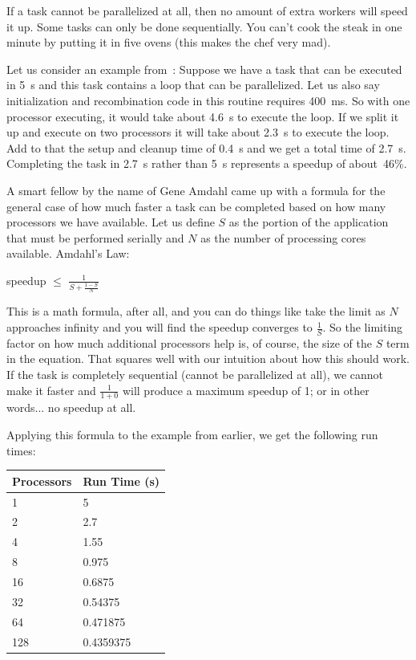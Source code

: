 If a task cannot be parallelized at all, then no amount of extra workers will speed it up. Some tasks can only be done sequentially. You can't cook the steak in one minute by putting it in five ovens (this makes the chef very mad).

Let us consider an example from~\cite{mte241}: Suppose we have a task that can be executed in 5~s and this task contains a loop that can be parallelized. Let us also say initialization and recombination code in this routine requires 400~ms. So with one processor executing, it would take about 4.6~s to execute the loop. If we split it up and execute on two processors it will take about 2.3~s to execute the loop. Add to that the setup and cleanup time of 0.4~s and we get a total time of 2.7~s. Completing the task in 2.7~s rather than 5~s represents a speedup of about~46\%.

A smart fellow by the name of Gene Amdahl came up with a formula for the general case of how much faster a task can be completed based on how many processors we have available. Let us define $S$ as the portion of the application that must be performed serially and $N$ as the number of processing cores available. Amdahl's Law:

\begin{center}
	speedup $\leq$ {\huge $\frac{1}{S + \frac{1-S}{N}}$}
\end{center}

This is a math formula, after all, and you can do things like take the limit as $N$ approaches infinity and you will find the speedup converges to $\frac{1}{S}$. So the limiting factor on how much additional processors help is, of course, the size of the $S$ term in the equation. That squares well with our intuition about how this should work. If the task is completely sequential (cannot be parallelized at all), we cannot make it faster and $\frac{1}{1 + 0}$ will produce a maximum speedup of 1; or in other words... no speedup at all.

Applying this formula to the example from earlier, we get the following run times:

\begin{center}
	\begin{tabular}{l|l}
		\textbf{Processors} & \textbf{Run Time (s)} \\ \hline
		1                   & 5                     \\
		2                   & 2.7                   \\
		4                   & 1.55                  \\
		8                   & 0.975                 \\
		16                  & 0.6875                \\
		32                  & 0.54375               \\
		64                  & 0.471875              \\
		128                 & 0.4359375             \\
	\end{tabular}
\end{center}

